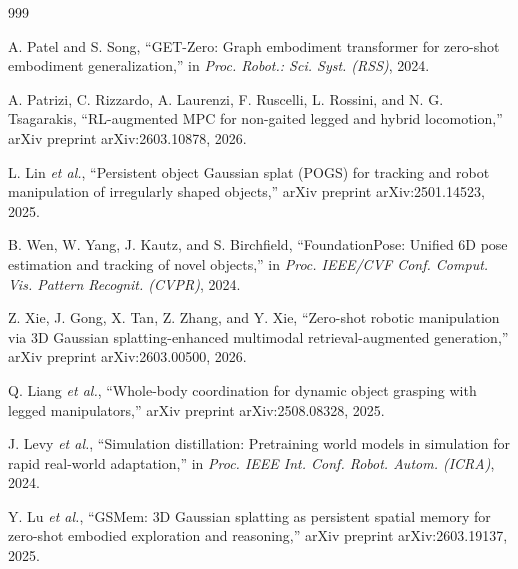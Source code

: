 \documentclass[12pt,a4paper,oneside]{report}
\begin{document}
\begin{thebibliography}{999}

A. Patel and S. Song, ``{GET-Zero}: Graph embodiment transformer for zero-shot embodiment generalization,'' in \textit{Proc. Robot.: Sci. Syst. (RSS)}, 2024.




A. Patrizi, C. Rizzardo, A. Laurenzi, F. Ruscelli, L. Rossini, and N. G. Tsagarakis, ``RL-augmented MPC for non-gaited legged and hybrid locomotion,'' arXiv preprint arXiv:2603.10878, 2026.




L. Lin \textit{et al.}, ``Persistent object Gaussian splat ({POGS}) for tracking and robot manipulation of irregularly shaped objects,'' arXiv preprint arXiv:2501.14523, 2025.




B. Wen, W. Yang, J. Kautz, and S. Birchfield, ``FoundationPose: Unified 6D pose estimation and tracking of novel objects,'' in \textit{Proc. IEEE/CVF Conf. Comput. Vis. Pattern Recognit. (CVPR)}, 2024.




Z. Xie, J. Gong, X. Tan, Z. Zhang, and Y. Xie, ``Zero-shot robotic manipulation via {3D} Gaussian splatting-enhanced multimodal retrieval-augmented generation,'' arXiv preprint arXiv:2603.00500, 2026.




Q. Liang \textit{et al.}, ``Whole-body coordination for dynamic object grasping with legged manipulators,'' arXiv preprint arXiv:2508.08328, 2025.




J. Levy \textit{et al.}, ``Simulation distillation: Pretraining world models in simulation for rapid real-world adaptation,'' in \textit{Proc. IEEE Int. Conf. Robot. Autom. (ICRA)}, 2024.




Y. Lu \textit{et al.}, ``{GSMem}: {3D} Gaussian splatting as persistent spatial memory for zero-shot embodied exploration and reasoning,'' arXiv preprint arXiv:2603.19137, 2025.




\end{thebibliography}
\end{document}
